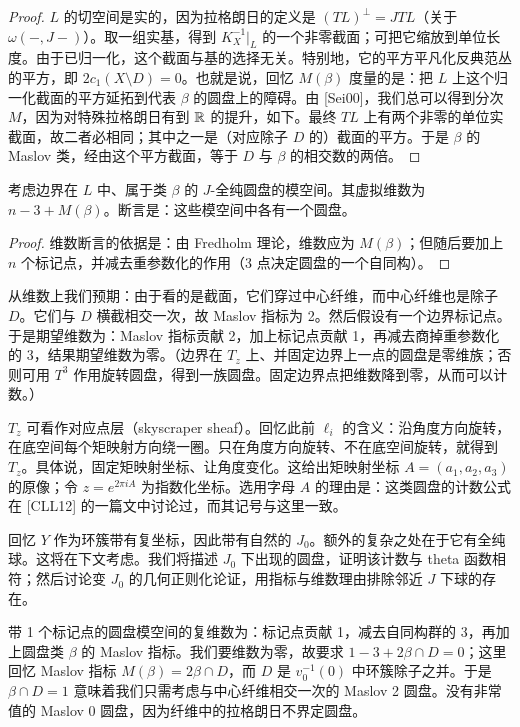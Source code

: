 \begin{proof}
$L$ 的切空间是实的，因为拉格朗日的定义是 $(TL)^\perp=JTL$（关于 $\omega(-,J-)$）。取一组实基，得到 $K_X^{-1}|_L$ 的一个非零截面；可把它缩放到单位长度。由于已归一化，这个截面与基的选择无关。特别地，它的平方平凡化反典范丛的平方，即 $2c_1(X\setminus D)=0$。也就是说，回忆 $M(\beta)$ 度量的是：把 $L$ 上这个归一化截面的平方延拓到代表 $\beta$ 的圆盘上的障碍。由 [Sei00]，我们总可以得到分次 $M$，因为对特殊拉格朗日有到 $\mathbb{R}$ 的提升，如下。最终 $TL$ 上有两个非零的单位实截面，故二者必相同；其中之一是（对应除子 $D$ 的）截面的平方。于是 $\beta$ 的 Maslov 类，经由这个平方截面，等于 $D$ 与 $\beta$ 的相交数的两倍。
\end{proof}

\begin{theorem}[{[CO06], [Aur07]}]\label{thm:dimension}
考虑边界在 $L$ 中、属于类 $\beta$ 的 $J$-全纯圆盘的模空间。其虚拟维数为 $n-3+M(\beta)$。断言是：这些模空间中各有一个圆盘。
\end{theorem}

\begin{proof}
维数断言的依据是：由 Fredholm 理论，维数应为 $M(\beta)$；但随后要加上 $n$ 个标记点，并减去重参数化的作用（3 点决定圆盘的一个自同构）。
\end{proof}

从维数上我们预期：由于看的是截面，它们穿过中心纤维，而中心纤维也是除子 $D$。它们与 $D$ 横截相交一次，故 Maslov 指标为 2。然后假设有一个边界标记点。于是期望维数为：Maslov 指标贡献 2，加上标记点贡献 1，再减去商掉重参数化的 3，结果期望维数为零。（边界在 $T_z$ 上、并固定边界上一点的圆盘是零维族；否则可用 $T^3$ 作用旋转圆盘，得到一族圆盘。固定边界点把维数降到零，从而可以计数。）

$T_z$ 可看作对应点层（skyscraper sheaf）。回忆此前 $\ell_i$ 的含义：沿角度方向旋转，在底空间每个矩映射方向绕一圈。只在角度方向旋转、不在底空间旋转，就得到 $T_z$。具体说，固定矩映射坐标、让角度变化。这给出矩映射坐标 $A=(a_1,a_2,a_3)$ 的原像；令 $z=e^{2\pi iA}$ 为指数化坐标。选用字母 $A$ 的理由是：这类圆盘的计数公式在 [CLL12] 的一篇文中讨论过，而其记号与这里一致。

回忆 $Y$ 作为环簇带有复坐标，因此带有自然的 $J_0$。额外的复杂之处在于它有全纯球。这将在下文考虑。我们将描述 $J_0$ 下出现的圆盘，证明该计数与 theta 函数相符；然后讨论变 $J_0$ 的几何正则化论证，用指标与维数理由排除邻近 $J$ 下球的存在。

带 1 个标记点的圆盘模空间的复维数为：标记点贡献 1，减去自同构群的 3，再加上圆盘类 $\beta$ 的 Maslov 指标。我们要维数为零，故要求 $1-3+2\beta\cap D=0$；这里回忆 Maslov 指标 $M(\beta)=2\beta\cap D$，而 $D$ 是 $v_0^{-1}(0)$ 中环簇除子之并。于是 $\beta\cap D=1$ 意味着我们只需考虑与中心纤维相交一次的 Maslov 2 圆盘。没有非常值的 Maslov 0 圆盘，因为纤维中的拉格朗日不界定圆盘。

